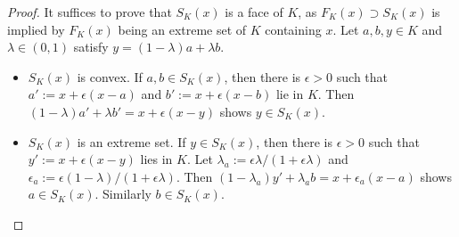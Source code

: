 \documentclass[10pt,a4paper]{amsart}
\begin{document}
\begin{proof}
It suffices to prove that $S_K(x)$ is a face of $K$, as $F_K(x)\supset S_K(x)$ 
is implied by $F_K(x)$ being an extreme set of $K$ containing $x$. Let 
$a,b,y\in K$ and $\lambda\in(0,1)$ satisfy $y=(1-\lambda)a+\lambda b$.
\par
%
\begin{itemize}
\item 
$S_K(x)$ is convex. If $a,b\in S_K(x)$, then there is $\epsilon>0$ such that 
$a':=x+\epsilon(x-a)$ and $b':=x+\epsilon(x-b)$ lie in $K$. Then 
$(1-\lambda)a'+\lambda b'=x+\epsilon(x-y)$ shows $y\in S_K(x)$.
%
\item
$S_K(x)$ is an extreme set. If $y\in S_K(x)$, then there is $\epsilon>0$ 
such that $y':=x+\epsilon(x-y)$ lies in $K$. Let
$\lambda_a:=\epsilon \lambda/(1+\epsilon \lambda)$ and 
$\epsilon_a:=\epsilon(1-\lambda)/(1+\epsilon \lambda)$. Then 
$(1-\lambda_a)y'+\lambda_a b=x+\epsilon_a(x-a)$ shows $a\in S_K(x)$. 
Similarly $b\in S_K(x)$. 
\qedhere
\end{itemize}
\end{proof}
\end{document}
